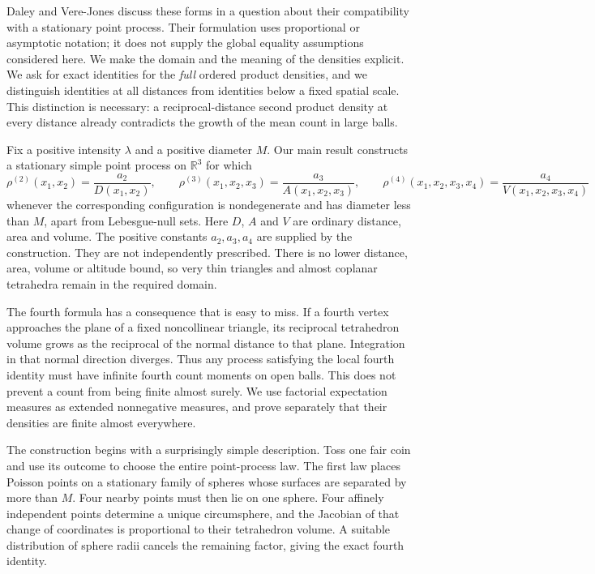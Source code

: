 \documentclass[11pt,a4paper]{article}
\numberwithin{equation}{section}
\theoremstyle{definition}
\theoremstyle{remark}
\newcommand{\R}{\mathbb R}
\begin{document}
Daley and Vere-Jones \cite[Exercise 12.6.11]{DVJ2008} discuss these forms in
a question about their compatibility with a stationary point process.
Their formulation uses proportional or asymptotic notation; it does not
supply the global equality assumptions considered here. We make the domain
and the meaning of the densities explicit. We ask for exact identities for
the \emph{full} ordered product densities, and we distinguish identities at
all distances from identities below a fixed spatial scale. This distinction
is necessary: a reciprocal-distance second product density at every
distance already contradicts the growth of the mean count in large balls.

Fix a positive intensity $\lambda$ and a positive diameter $M$. Our main
result constructs a stationary simple point process on $\R^3$ for which
\[
 \rho^{(2)}(x_1,x_2)=\frac{a_2}{D(x_1,x_2)},\qquad
 \rho^{(3)}(x_1,x_2,x_3)=\frac{a_3}{A(x_1,x_2,x_3)},\qquad
 \rho^{(4)}(x_1,x_2,x_3,x_4)=\frac{a_4}{V(x_1,x_2,x_3,x_4)}
\]
whenever the corresponding configuration is nondegenerate and has diameter
less than $M$, apart from Lebesgue-null sets. Here $D$, $A$ and $V$ are
ordinary distance, area and volume. The positive constants $a_2,a_3,a_4$
are supplied by the construction. They are not independently prescribed.
There is no lower distance, area, volume or altitude bound, so very thin
triangles and almost coplanar tetrahedra remain in the required domain.

The fourth formula has a consequence that is easy to miss. If a fourth
vertex approaches the plane of a fixed noncollinear triangle, its
reciprocal tetrahedron volume grows as the reciprocal of the normal
distance to that plane. Integration in that normal direction diverges.
Thus any process satisfying the local fourth identity must have infinite
fourth count moments on open balls. This does not prevent a count from
being finite almost surely. We use factorial expectation measures as
extended nonnegative measures, and prove separately that their densities
are finite almost everywhere.

The construction begins with a surprisingly simple description. Toss one
fair coin and use its outcome to choose the entire point-process law.
The first law places Poisson points on a stationary family of spheres
whose surfaces are separated by more than $M$. Four nearby points must
then lie on one sphere. Four affinely independent points determine a
unique circumsphere, and the Jacobian of that change of coordinates is
proportional to their tetrahedron volume. A suitable distribution of sphere
radii cancels the remaining factor, giving the exact fourth identity.
\end{document}
